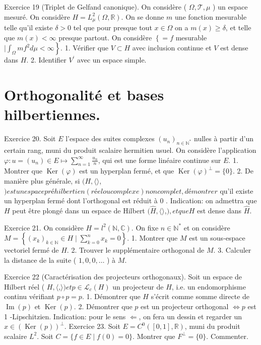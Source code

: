 \documentclass[12pt,a4paper]{article}
\begin{document}
Exercice 19 (Triplet de Gelfand canonique). On considère ( \(\Omega, \mathcal{T}, \mu\) ) un espace mesuré. On considère \(H=L_{\mu}^{2}(\Omega, \mathbb{R})\). On se donne \(m\) une fonction mesurable telle qu'il existe \(\delta>0\) tel que pour presque tout \(x \in \Omega\) on a \(m(x) \geqslant \delta\), et telle que \(m(x)<\infty\) presque partout. On considère \(\left\{=f\right.\) mesurable \(\left.\mid \int_{\Omega} m f^{2} d \mu<\infty\right\}\).
1. Vérifier que \(V \subset H\) avec inclusion continue et \(V\) est dense dans \(H\).
2. Identifier \(V^{\prime}\) avec un espace simple.

\section*{Orthogonalité et bases hilbertiennes.}

Exercice 20. Soit \(E\) l'espace des suites complexes \(\left(u_{n}\right)_{n \in \mathbb{N}^{*}}\) nulles à partir d'un certain rang, muni du produit scalaire hermitien usuel. On considère l'application \(\varphi: u=\left(u_{n}\right) \in E \mapsto \sum_{n=1}^{\infty} \frac{u_{n}}{n}\), qui est une forme linéaire continue sur \(E\).
1. Montrer que \(\operatorname{Ker}(\varphi)\) est un hyperplan fermé, et que \(\operatorname{Ker}(\varphi)^{\perp}=\{0\}\).
2. De manière plus générale, si \((H,\langle\rangle\),\() est un espace préhilbertien (réel ou complexe) non complet, démontrer\) qu'il existe un hyperplan fermé dont l'orthogonal est réduit à 0 . Indication: on admettra que \(H\) peut être plongé dans un espace de Hilbert \((\widehat{H},\langle\rangle\),\() , et que H\) est dense dans \(\widehat{H}\).

Exercice 21. On considère \(H=l^{2}(\mathbb{N}, \mathbb{C})\). On fixe \(n \in \mathbb{N}^{*}\) et on considère \(M=\left\{\left(x_{k}\right)_{k \in \mathbb{N}} \in H \mid \sum_{k=0}^{n} x_{k}=0\right\}\).
1. Montrer que \(M\) est un sous-espace vectoriel fermé de \(H\).
2. Trouver le supplémentaire orthogonal de \(M\).
3. Calculer la distance de la suite ( \(1,0,0, \ldots\) ) à \(M\).

Exercice 22 (Caractérisation des projecteurs orthogonaux). Soit un espace de Hilbert réel ( \(H,\langle\),\(\rangle ) et p \in \mathcal{L}_{c}(H)\) un projecteur de \(H\), i.e. un endomorphisme continu vérifiant \(p \circ p=p\).
1. Démontrer que \(H\) s'écrit comme somme directe de \(\operatorname{Im}(p)\) et \(\operatorname{Ker}(p)\).
2. Démontrer que \(p\) est un projecteur orthogonal \(\Leftrightarrow p\) est 1 -Lipschitzien. Indication: pour le sens \(\Leftarrow\), on fera un dessin et regarder un \(x \in(\operatorname{Ker}(p))^{\perp}\).
Exercice 23. Soit \(E=C^{0}([0,1], \mathbb{R})\), muni du produit scalaire \(L^{2}\). Soit \(C=\{f \in E \mid f(0)=0\}\). Montrer que \(F^{\perp}=\{0\}\). Commenter.
\end{document}

